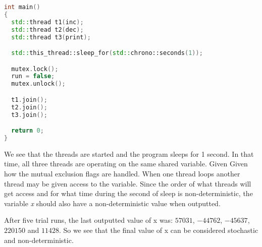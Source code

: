 \begin{lstlisting}[language=C++, caption=Main method]
int main()
{
  std::thread t1(inc);
  std::thread t2(dec);
  std::thread t3(print);

  std::this_thread::sleep_for(std::chrono::seconds(1));

  mutex.lock();
  run = false;
  mutex.unlock();

  t1.join();
  t2.join();
  t3.join();

  return 0;
}
\end{lstlisting}

We see that the threads are started and the program sleeps for 1 second.
In that time, all three threads are operating on the same shared variable. Given
Given how the mutual exclusion flags are handled. When one thread loops another
thread may be given access to the variable. Since the order of what threads will
get access and for what time during the second of sleep is non-deterministic, the
variable \textit{x} should also have a non-deterministic value when outputted.

After five trial runs, the last outputted value of x was: $57031$, $-44762$, 
$-45637$, $220150$ and $11428$. So we see that the final value of x can be 
considered stochastic and non-deterministic. 